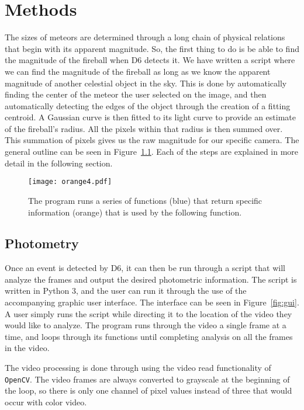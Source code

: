 \chapter{Methods}

The sizes of meteors are determined through a long chain of physical relations that begin with its apparent magnitude. So, the first thing to do is be able to find the magnitude of the fireball when D6 detects it. We have written a script where we can find the magnitude of the fireball as long as we know the apparent magnitude of another celestial object in the sky. This is done by automatically finding the center of the meteor the user selected on the image, and then automatically detecting the edges of the  object through the creation of a fitting centroid. A Gaussian curve is then fitted to its light curve to provide an estimate of the fireball's radius. All the pixels within that radius is then summed over. This summation of pixels gives us the raw magnitude for our specific camera. The general outline can be seen in Figure~\ref{fig:flowchart}. Each of the steps are explained in more detail in the following section.

\begin{figure}[htpb]
	\centering
	\texttt{[image: orange4.pdf]}
	\caption{The program runs a series of functions (blue) that return specific information (orange) that is used by the following function.}
	\label{fig:flowchart}
\end{figure}

\section{Photometry}

Once an event is detected by D6, it can then be run through a script that will analyze the frames and output the desired photometric information. The script is written in Python 3, and the user can run it through the use of the accompanying graphic user interface. The interface can be seen in Figure~\ref{fig:gui}. A user simply runs the script while directing it to the location of the video they would like to analyze. The program runs through the video a single frame at a time, and loops through its functions until completing analysis on all the frames in the video.

The video processing is done through using the video read functionality of \texttt{OpenCV}. The video frames are always converted to grayscale at the beginning of the loop, so there is only one channel of pixel values instead of three that would occur with color video.

